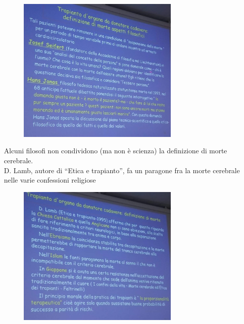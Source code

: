 \begin{figure}[!ht]
\centering
	\includegraphics[width=0.7\textwidth]{34/image13.jpeg}
	\end{figure}

Alcuni filosofi non condividono (ma non è scienza) la definizione di
morte cerebrale.
\\
D. Lamb, autore di ``Etica e trapianto'', fa un paragone fra la morte
cerebrale nelle varie confessioni religiose

\begin{figure}[!ht]
\centering
	\includegraphics[width=0.7\textwidth]{34/image14.jpeg}
	\end{figure}

